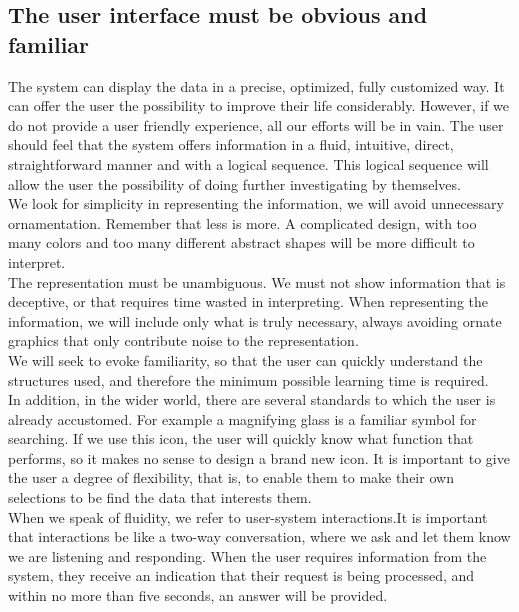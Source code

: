 \subsection{The user interface must be obvious and familiar}

The system can display the data in a precise, optimized, fully customized way. It can offer the user
the possibility to improve their life considerably. However, if we do not provide a user friendly experience, all our efforts will be in vain.
The user should feel that the system offers information in a fluid, intuitive, direct, straightforward manner and with
a logical sequence. This logical sequence will allow the user the possibility of doing further investigating by themselves.\\

We look for simplicity in representing the information, we will avoid unnecessary ornamentation. Remember that less is more. A complicated design, with too many colors and too many different abstract shapes will be more difficult to interpret.\\

The representation must be unambiguous. We must not show information that is deceptive, or that requires time wasted in interpreting. When representing the information, we will 
include only what is truly necessary, always avoiding ornate graphics that only contribute noise to the representation.\\

We will seek to evoke familiarity, so that the user can quickly understand the structures used,
and therefore the minimum possible learning time is required.\\

In addition, in the wider world, there are several standards to which the user is already accustomed.
For example a magnifying glass is a familiar symbol for searching. If we use this icon, the user will quickly know what
function that performs, so it makes no sense to design a brand new icon.
It is important to give the user a degree of flexibility, that is, to enable them to make their own selections to be find the data that interests them.\\

When we speak of fluidity, we refer to user-system interactions.It is important that interactions
be like a two-way conversation, where we ask and let them know we are listening and responding. When the user
requires information from the system, they receive an indication that their request is being processed, and within no more than five seconds, an answer will be provided.
    
